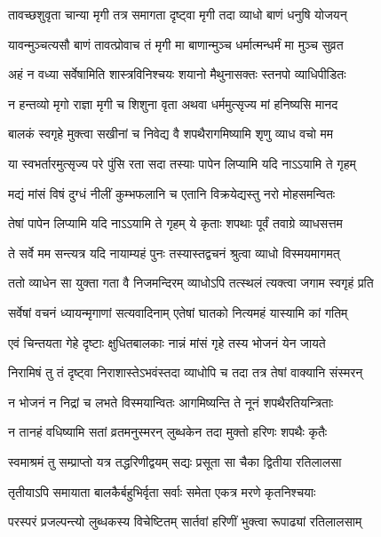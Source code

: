 \twolineshloka
{तावच्छशुवृता चान्या मृगी तत्र समागता}
{दृष्ट्वा मृगी तदा व्याधो बाणं धनुषि योजयन्}%

\twolineshloka
{यावन्मुञ्चत्यसौ बाणं तावत्प्रोवाच तं मृगी}
{मा बाणान्मुञ्च धर्मात्मन्धर्मं मा मुञ्च सुव्रत}%

\twolineshloka
{अहं न वध्या सर्वेषामिति शास्त्रविनिश्चयः}
{शयानो मैथुनासक्तः स्तनपो व्याधिपीडितः}%

\twolineshloka
{न हन्तव्यो मृगो राज्ञा मृगी च शिशुना वृता}
{अथवा धर्ममुत्सृज्य मां हनिष्यसि मानद}%

\twolineshloka
{बालकं स्वगृहे मुक्त्वा सखीनां च निवेद्य वै}
{शपथैरागमिष्यामि शृणु व्याध वचो मम}%

\twolineshloka
{या स्वभर्तारमुत्सृज्य परे पुंसि रता सदा}
{तस्याः पापेन लिप्यामि यदि नाऽऽयामि ते गृहम्}%

\twolineshloka
{मद्यं मांसं विषं दुग्धं नीलीं कुम्भफलानि च}
{एतानि विक्रयेद्यस्तु नरो मोहसमन्वितः}%

\twolineshloka
{तेषां पापेन लिप्यामि यदि नाऽऽयामि ते गृहम्}
{ये कृताः शपथाः पूर्वं तवाग्रे व्याधसत्तम}%

\twolineshloka
{ते सर्वे मम सन्त्यत्र यदि नायाम्यहं पुनः}
{तस्यास्तद्वचनं श्रुत्वा व्याधो विस्मयमागमत्}%

\twolineshloka
{ततो व्याधेन सा युक्ता गता वै निजमन्दिरम्}
{व्याधोऽपि तत्स्थलं त्यक्त्वा जगाम स्वगृहं प्रति}%

\twolineshloka
{सर्वेषां वचनं ध्यायन्मृगाणां सत्यवादिनाम्}
{एतेषां घातको नित्यमहं यास्यामि कां गतिम्}%

\twolineshloka
{एवं चिन्तयता गेहे दृष्टाः क्षुधितबालकाः}
{नान्नं मांसं गृहे तस्य भोजनं येन जायते}%

\twolineshloka
{निरामिषं तु तं दृष्ट्वा निराशास्तेऽभवंस्तदा}
{व्याधोपि च तदा तत्र तेषां वाक्यानि संस्मरन्}%

\twolineshloka
{न भोजनं न निद्रां च लभते विस्मयान्वितः}
{आगमिष्यन्ति ते नूनं शपथैरतियन्त्रिताः}%

\twolineshloka
{न तानहं वधिष्यामि सतां व्रतमनुस्मरन्}
{लुब्धकेन तदा मुक्तो हरिणः शपथैः कृतैः}%

\twolineshloka
{स्वमाश्रमं तु सम्प्राप्तो यत्र तद्धरिणीद्वयम्}
{सद्यः प्रसूता सा चैका द्वितीया रतिलालसा}%

\twolineshloka
{तृतीयाऽपि समायाता बालकैर्बहुभिर्वृता}
{सर्वाः समेता एकत्र मरणे कृतनिश्चयाः}%

\twolineshloka
{परस्परं प्रजल्पन्त्यो लुब्धकस्य विचेष्टितम्}
{सार्तवां हरिणीं भुक्त्वा रूपाढ्यां रतिलालसाम्}%

